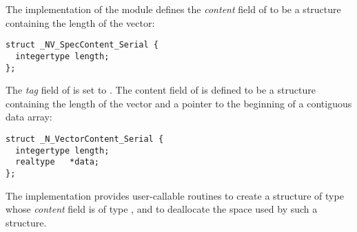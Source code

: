 %
The {\nvecs} implementation of the {\nvector} module
defines the {\em content} field of  to be a structure 
containing the length of the vector:
\begin{verbatim}
struct _NV_SpecContent_Serial {
  integertype length;
};
\end{verbatim}
The {\em tag} field of  is set to .
The content field of  is defined to be a structure containing
the length of the vector and a pointer to the beginning of a contiguous data array:
\begin{verbatim} 
struct _N_VectorContent_Serial {
  integertype length;
  realtype   *data;
};
\end{verbatim}

The {\nvecs} implementation provides user-callable routines  
to create a structure of type  whose {\em content} field is 
of type , and  
to deallocate the space used by such a structure. 

